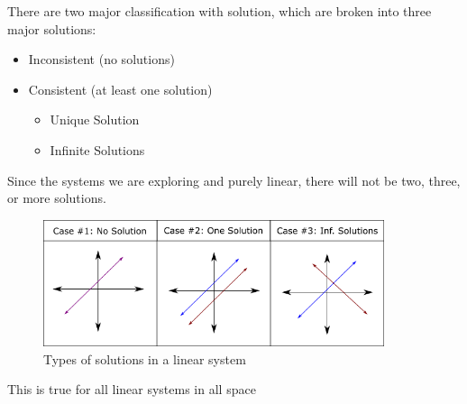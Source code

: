 \documentclass{report}
\begin{document}
\begin{definition}
There are two major classification with solution, which are broken into three major solutions:
\begin{itemize}
	\item Inconsistent (no solutions)
	\item Consistent (at least one solution)
	\begin{itemize}
		\item Unique Solution
		\item Infinite Solutions
	\end{itemize}
\end{itemize}
Since the systems we are exploring and purely linear, there will not be two, three, or more solutions.
\end{definition}
\begin{figure}[h]

\begin{center}
  \includegraphics[width=10cm]{figures/solutions}
  \caption{Types of solutions in a linear system}
  \label{fig:graph1}
\end{center}
\end{figure}

\begin{remark}
This is true for all linear systems in all space
\end{remark}
\end{document}
